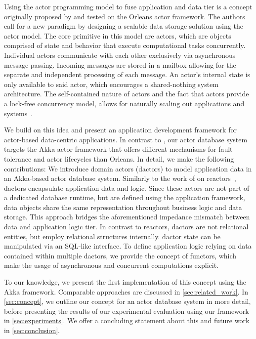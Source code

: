   Using the actor programming model to fuse application and data tier is a concept originally proposed by \citet{manifesto} and tested on the Orleans actor framework.
  The authors call for a new paradigm by designing a scalable data storage solution using the actor model.
  The core primitive in this model are actors, which are objects comprised of state and behavior that execute computational tasks concurrently.
  Individual actors communicate with each other exclusively via asynchronous message passing.
  Incoming messages are stored in a mailbox allowing for the separate and independent processing of each message.
  An actor's internal state is only available to said actor, which encourages a shared-nothing system architecture.
  The self-contained nature of actors and the fact that actors provide a lock-free concurrency model, allows for naturally scaling out applications and systems~\cite{vernon2015reactive}.
  

  We build on this idea and present an application development framework for actor-based data-centric applications.
  In contrast to \citet{manifesto}, our actor database system targets the Akka actor framework that offers different mechanisms for fault tolerance and actor lifecycles than Orleans.
  In detail, we make the following contributions:
  We introduce domain actors (\glspl{dactor}) to model application data in an Akka-based actor database system.
  Similarly to the work of \citeauthor{Shah:reactdb} on reactors~\cite{Shah:reactdb}, \glspl{dactor} encapsulate application data and logic.
  Since these actors are not part of a dedicated database runtime, but are defined using the application framework, data objects share the same representation throughout business logic and data storage.
  This approach bridges the aforementioned impedance mismatch between data and application logic tier.
  In contrast to reactors, \glspl{dactor} are not relational entities, but employ relational structures internally.
  \Gls{dactor} state can be manipulated via an SQL-like interface.
  To define application logic relying on data contained within multiple \glspl{dactor}, we provide the concept of \glspl{functor}, which make the usage of asynchronous and concurrent computations explicit.

  To our knowledge, we present the first implementation of this concept using the Akka framework.
  Comparable approaches are discussed in \cref{sec:related_work}.
  In \cref{sec:concept}, we outline our concept for an actor database system in more detail,
  before presenting the results of our experimental evaluation using our framework in \cref{sec:experiments}.
  We offer a concluding statement about this and future work in \cref{sec:conclusion}.
  
